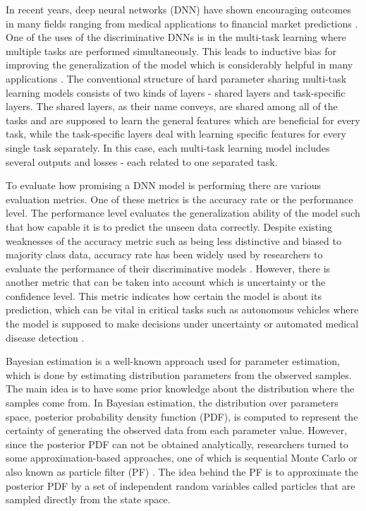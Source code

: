 \documentclass[12pt,a4paper]{article}
\begin{document}
	In recent years, deep neural networks (DNN) have shown encouraging outcomes in many fields ranging from medical applications \cite{castiglioni2021ai, aggarwal2021diagnostic} to financial market predictions \cite{fischer2018deep, kamara2022ensemble}. One of the uses of the discriminative DNNs is in the multi-task learning \cite{caruana1997multitask} where multiple tasks are performed simultaneously. This leads to inductive bias for improving the generalization of the model which is considerably helpful in many applications \cite{zheng2020discriminative, chen2018multi}. The conventional structure of hard parameter sharing multi-task learning models consists of two kinds of layers - shared layers and task-specific layers. The shared layers, as their name conveys, are shared among all of the tasks and are supposed to learn the general features which are beneficial for every task, while the task-specific layers deal with learning specific features for every single task separately. In this case, each multi-task learning model includes several outputs and losses - each related to one separated task.
	
	To evaluate how promising a DNN model is performing there are various evaluation metrics. One of these metrics is the accuracy rate or the performance level. The performance level evaluates the generalization ability of the model such that how capable it is to predict the unseen data correctly. Despite existing weaknesses of the accuracy metric such as being less distinctive and biased to majority class data, accuracy rate has been widely used by researchers to evaluate the performance of their discriminative models \cite{hossin2015review}. However, there is another metric that can be taken into account which is uncertainty or the confidence level. This metric indicates how certain the model is about its prediction, which can be vital in critical tasks such as autonomous vehicles where the model is supposed to make decisions under uncertainty \cite{sefati2017towards} or automated medical disease detection \cite{ayhan2020expert}.
	
	Bayesian estimation is a well-known approach used for parameter estimation, which is done by estimating distribution parameters from the observed samples. The main idea is to have some prior knowledge about the distribution where the samples come from. In Bayesian estimation, the distribution over parameters space, posterior probability density function (PDF), is computed to represent the certainty of generating the observed data from each parameter value. However, since the posterior PDF can not be obtained analytically, researchers turned to some approximation-based approaches, one of which is sequential Monte Carlo or also known as particle filter (PF) \cite{delmoral1997nonlinear}. The idea behind the PF is to approximate the posterior PDF by a set of independent random variables called particles that are sampled directly from the state space.
	
\end{document}
